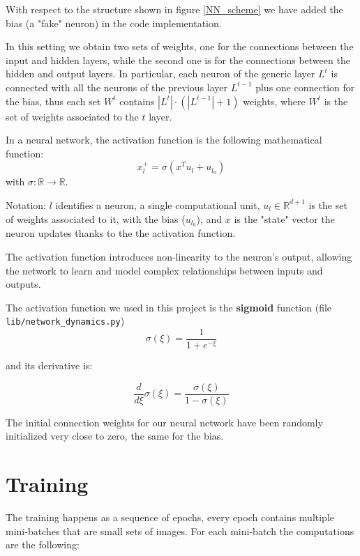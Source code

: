 \documentclass[a4paper,11pt,oneside]{book}
\begin{document}
With respect to the structure shown in figure \ref{NN_scheme} we have added the bias (a "fake" neuron) in the code implementation.

\bigskip
In this setting we obtain two sets of weights, one for the connections between the input and hidden layers, while the second one is for the connections between the hidden and output layers. In particular, each neuron of the generic layer $L^t$ is connected with all the neurons of the previous layer $L^{t-1}$ plus one connection for the bias, thus each set $W^t$ contains $|L^t| \cdot (|L^{t-1}| + 1)$ weights, where $W^t$ is the set of weights associated to the $t$ layer.

\bigskip
In a neural network, the activation function is the following mathematical function:
\begin{equation}
x_l^+= \sigma(x^T u_l + u_{l_0})
\end{equation}
with $\sigma: \mathbb{R} \to \mathbb{R}$.

Notation: $l$ identifies a neuron, a single computational unit, $u_l \in \mathbb{R}^{d+1}$ is the set of weights associated to it, with the bias ($u_{l_0}$), and $x$ is the "state" vector the neuron updates thanks to the the activation function. 

\bigskip
The activation function introduces non-linearity to the neuron's output, allowing the network to learn and model complex relationships between inputs and outputs.

\bigskip
The activation function we used in this project is the \textbf{sigmoid} function (file \texttt{lib/network\_dynamics.py})
\begin{equation}
\sigma(\xi) = \frac{1}{1 + e^{-\xi}}
\end{equation}

and its derivative is:

\begin{equation}
\frac{d}{d\xi}\sigma(\xi) = \frac{\sigma(\xi)}{1 - \sigma(\xi)}
\end{equation}

The initial connection weights for our neural network have been randomly initialized very close to zero, the same for the bias.

\section{Training}
The training happens as a sequence of epochs, every epoch contains multiple mini-batches that are small sets of images. For each mini-batch the computations are the following:
\end{document}
